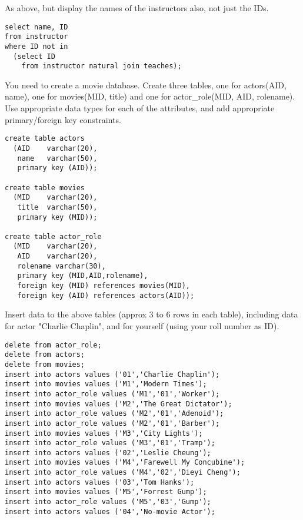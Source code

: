 \documentclass[logo,reportComp]{thesis}
\begin{document}
\begin{question}
\normalfont 
As above, but display the names of the instructors also, not just the IDs.
\end{question}
\begin{answer}\mbox{}\par
\begin{lstlisting}
select name, ID
from instructor
where ID not in
  (select ID
    from instructor natural join teaches);
\end{lstlisting}
\end{answer}

\begin{question}
\normalfont 
You need to create a movie database. Create three tables, one for actors(AID, name), one for movies(MID, title) and one for actor\_role(MID, AID, rolename). Use appropriate data types for each of the attributes, and add appropriate primary/foreign key constraints.
\end{question}
\begin{answer}\mbox{}\par
\begin{lstlisting}
create table actors
  (AID    varchar(20),
   name   varchar(50),
   primary key (AID));

create table movies
  (MID    varchar(20),
   title  varchar(50),
   primary key (MID));

create table actor_role
  (MID    varchar(20),
   AID    varchar(20),
   rolename varchar(30),
   primary key (MID,AID,rolename),
   foreign key (MID) references movies(MID),
   foreign key (AID) references actors(AID));
\end{lstlisting}
\end{answer}

\begin{question}
\normalfont 
Insert data to the above tables (approx 3 to 6 rows in each table), including data for actor "Charlie Chaplin", and for yourself (using your roll number as ID).
\end{question}
\begin{answer}\mbox{}\par
\begin{lstlisting}
delete from actor_role;
delete from actors;
delete from movies;
insert into actors values ('01','Charlie Chaplin');
insert into movies values ('M1','Modern Times');
insert into actor_role values ('M1','01','Worker');
insert into movies values ('M2','The Great Dictator');
insert into actor_role values ('M2','01','Adenoid');
insert into actor_role values ('M2','01','Barber');
insert into movies values ('M3','City Lights');
insert into actor_role values ('M3','01','Tramp');
insert into actors values ('02','Leslie Cheung');
insert into movies values ('M4','Farewell My Concubine');
insert into actor_role values ('M4','02','Dieyi Cheng');
insert into actors values ('03','Tom Hanks');
insert into movies values ('M5','Forrest Gump');
insert into actor_role values ('M5','03','Gump');
insert into actors values ('04','No-movie Actor');
\end{lstlisting}
\end{answer}
\end{document}
